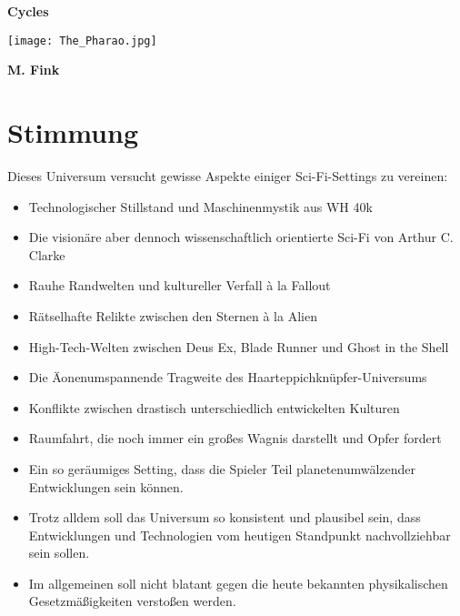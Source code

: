 \documentclass[10pt,a4paper]{report}
\author{Marco Fink}
\begin{document}
\begin{titlepage}
	\begin{center}
	\textbf{\Huge Cycles}
	
	\vspace{2cm}
	
	\texttt{[image: The\_Pharao.jpg]}

	\vspace{2cm}
	\textbf{\Large M. Fink}
	\end{center}
\end{titlepage}

\tableofcontents
\newpage
\section*{Stimmung}
Dieses Universum versucht gewisse Aspekte einiger Sci-Fi-Settings zu vereinen:
\begin{itemize}
\item Technologischer Stillstand und Maschinenmystik aus WH 40k
\item Die visionäre aber dennoch wissenschaftlich orientierte Sci-Fi von Arthur C. Clarke
\item Rauhe Randwelten und kultureller Verfall à la Fallout
\item Rätselhafte Relikte zwischen den Sternen à la Alien
\item High-Tech-Welten zwischen Deus Ex, Blade Runner und Ghost in the Shell
\item Die Äonenumspannende Tragweite des Haarteppichknüpfer-Universums
\item Konflikte zwischen drastisch unterschiedlich entwickelten Kulturen
\item Raumfahrt, die noch immer ein großes Wagnis darstellt und Opfer fordert
\item Ein so geräumiges Setting, dass die Spieler Teil planetenumwälzender Entwicklungen sein können.
\item Trotz alldem soll das Universum so konsistent und plausibel sein, dass Entwicklungen und Technologien vom heutigen Standpunkt nachvollziehbar sein sollen.
\item Im allgemeinen soll nicht blatant gegen die heute bekannten physikalischen Gesetzmäßigkeiten verstoßen werden.
\end{itemize}
\end{document}
